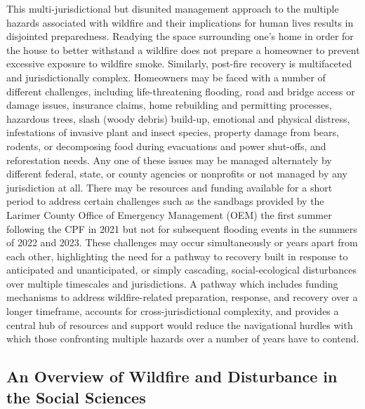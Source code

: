 \documentclass[
]{article}
\begin{document}
This multi-jurisdictional but disunited management approach to the multiple hazards associated with wildfire and their implications for human lives results in disjointed preparedness. Readying the space surrounding one's home in order for the house to better withstand a wildfire does not prepare a homeowner to prevent excessive exposure to wildfire smoke. Similarly, post-fire recovery is multifaceted and jurisdictionally complex. Homeowners may be faced with a number of different challenges, including life-threatening flooding, road and bridge access or damage issues, insurance claims, home rebuilding and permitting processes, hazardous trees, slash (woody debris) build-up, emotional and physical distress, infestations of invasive plant and insect species, property damage from bears, rodents, or decomposing food during evacuations and power shut-offs, and reforestation needs. Any one of these issues may be managed alternately by different federal, state, or county agencies or nonprofits or not managed by any jurisdiction at all. There may be resources and funding available for a short period to address certain challenges such as the sandbags provided by the Larimer County Office of Emergency Management (OEM) the first summer following the CPF in 2021 but not for subsequent flooding events in the summers of 2022 and 2023. These challenges may occur simultaneously or years apart from each other, highlighting the need for a pathway to recovery built in response to anticipated and unanticipated, or simply cascading, social-ecological disturbances over multiple timescales and jurisdictions. A pathway which includes funding mechanisms to address wildfire-related preparation, response, and recovery over a longer timeframe, accounts for cross-jurisdictional complexity, and provides a central hub of resources and support would reduce the navigational hurdles with which those confronting multiple hazards over a number of years have to contend.

\subsection{An Overview of Wildfire and Disturbance in the Social Sciences}\label{an-overview-of-wildfire-and-disturbance-in-the-social-sciences-1}
\end{document}
